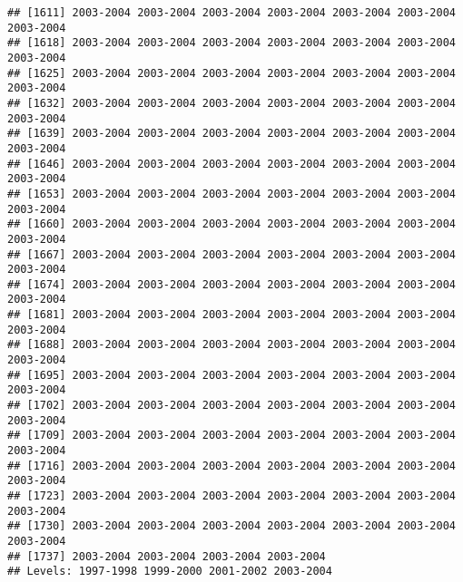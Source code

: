 \documentclass[
]{article}
\newenvironment{Shaded}{\begin{snugshade}}{\end{snugshade}}
\newcommand{\AttributeTok}[1]{\textcolor[rgb]{0.77,0.63,0.00}{#1}}
\newcommand{\CommentTok}[1]{\textcolor[rgb]{0.56,0.35,0.01}{\textit{#1}}}
\newcommand{\DecValTok}[1]{\textcolor[rgb]{0.00,0.00,0.81}{#1}}
\newcommand{\FunctionTok}[1]{\textcolor[rgb]{0.00,0.00,0.00}{#1}}
\newcommand{\NormalTok}[1]{#1}
\newcommand{\OtherTok}[1]{\textcolor[rgb]{0.56,0.35,0.01}{#1}}
\newcommand{\SpecialCharTok}[1]{\textcolor[rgb]{0.00,0.00,0.00}{#1}}
\newcommand{\StringTok}[1]{\textcolor[rgb]{0.31,0.60,0.02}{#1}}
\begin{document}
\begin{verbatim}
## [1611] 2003-2004 2003-2004 2003-2004 2003-2004 2003-2004 2003-2004 2003-2004
## [1618] 2003-2004 2003-2004 2003-2004 2003-2004 2003-2004 2003-2004 2003-2004
## [1625] 2003-2004 2003-2004 2003-2004 2003-2004 2003-2004 2003-2004 2003-2004
## [1632] 2003-2004 2003-2004 2003-2004 2003-2004 2003-2004 2003-2004 2003-2004
## [1639] 2003-2004 2003-2004 2003-2004 2003-2004 2003-2004 2003-2004 2003-2004
## [1646] 2003-2004 2003-2004 2003-2004 2003-2004 2003-2004 2003-2004 2003-2004
## [1653] 2003-2004 2003-2004 2003-2004 2003-2004 2003-2004 2003-2004 2003-2004
## [1660] 2003-2004 2003-2004 2003-2004 2003-2004 2003-2004 2003-2004 2003-2004
## [1667] 2003-2004 2003-2004 2003-2004 2003-2004 2003-2004 2003-2004 2003-2004
## [1674] 2003-2004 2003-2004 2003-2004 2003-2004 2003-2004 2003-2004 2003-2004
## [1681] 2003-2004 2003-2004 2003-2004 2003-2004 2003-2004 2003-2004 2003-2004
## [1688] 2003-2004 2003-2004 2003-2004 2003-2004 2003-2004 2003-2004 2003-2004
## [1695] 2003-2004 2003-2004 2003-2004 2003-2004 2003-2004 2003-2004 2003-2004
## [1702] 2003-2004 2003-2004 2003-2004 2003-2004 2003-2004 2003-2004 2003-2004
## [1709] 2003-2004 2003-2004 2003-2004 2003-2004 2003-2004 2003-2004 2003-2004
## [1716] 2003-2004 2003-2004 2003-2004 2003-2004 2003-2004 2003-2004 2003-2004
## [1723] 2003-2004 2003-2004 2003-2004 2003-2004 2003-2004 2003-2004 2003-2004
## [1730] 2003-2004 2003-2004 2003-2004 2003-2004 2003-2004 2003-2004 2003-2004
## [1737] 2003-2004 2003-2004 2003-2004 2003-2004
## Levels: 1997-1998 1999-2000 2001-2002 2003-2004
\end{verbatim}

\begin{Shaded}
\end{Shaded}
\end{document}
